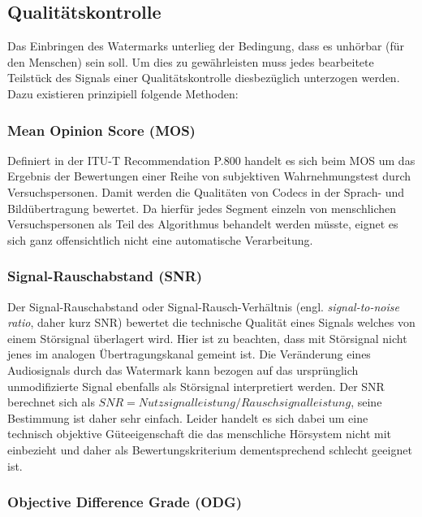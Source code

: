 \subsection{Qualitätskontrolle}
\label{sec:qualitaetskontrolle}

Das Einbringen des Watermarks unterlieg der Bedingung, dass es unhörbar (für den Menschen) sein soll. Um dies zu gewährleisten muss jedes bearbeitete Teilstück des Signals einer Qualitätskontrolle diesbezüglich unterzogen werden. Dazu existieren prinzipiell folgende Methoden:

\subsubsection{Mean Opinion Score (MOS)}

Definiert in der ITU-T Recommendation P.800\cite{rec1996p} handelt es sich beim MOS um das Ergebnis der Bewertungen einer Reihe von subjektiven Wahrnehmungstest durch Versuchspersonen. Damit werden die Qualitäten von Codecs in der Sprach- und Bildübertragung bewertet. Da hierfür jedes Segment einzeln von menschlichen Versuchspersonen als Teil des Algorithmus behandelt werden müsste, eignet es sich ganz offensichtlich nicht eine automatische Verarbeitung. 

\subsubsection{Signal-Rauschabstand (SNR)} 

Der Signal-Rauschabstand oder Signal-Rausch-Verhältnis (engl. \textit{signal-to-noise ratio}, daher kurz SNR) bewertet die technische Qualität eines Signals welches von einem Störsignal überlagert wird. Hier ist zu beachten, dass mit Störsignal nicht jenes im analogen Übertragungskanal gemeint ist. Die Veränderung eines Audiosignals durch das Watermark kann bezogen auf das ursprünglich unmodifizierte Signal ebenfalls als Störsignal interpretiert werden. Der SNR berechnet sich als $SNR = Nutzsignalleistung / Rauschsignalleistung$, seine Bestimmung ist daher sehr einfach. Leider handelt es sich dabei um eine technisch objektive Güteeigenschaft die das menschliche Hörsystem nicht mit einbezieht und daher als Bewertungskriterium dementsprechend schlecht geeignet ist\cite{xiang2007robust}.

\subsubsection{Objective Difference Grade (ODG)} 

